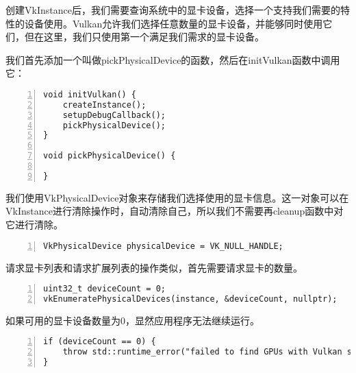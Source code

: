 \documentclass{ctexart}
\begin{document}
创建VkInstance后，我们需要查询系统中的显卡设备，选择一个支持我们需要的特性的设备使用。Vulkan允许我们选择任意数量的显卡设备，并能够同时使用它们，但在这里，我们只使用第一个满足我们需求的显卡设备。

我们首先添加一个叫做pickPhysicalDevice的函数，然后在initVulkan函数中调用它：

\begin{lstlisting}[language={[ANSI]C},keywordstyle=\color{blue!70},commentstyle=\color{red!50!green!50!blue!50},frame=shadowbox, rulesepcolor=\color{red!20!green!20!blue!20},basicstyle=\small,numbers=left, numberstyle=\tiny,breaklines=true]
void initVulkan() {
	createInstance();
	setupDebugCallback();
	pickPhysicalDevice();
}

void pickPhysicalDevice() {

}
\end{lstlisting}

我们使用VkPhysicalDevice对象来存储我们选择使用的显卡信息。这一对象可以在VkInstance进行清除操作时，自动清除自己，所以我们不需要再cleanup函数中对它进行清除。

\begin{lstlisting}[language={[ANSI]C},keywordstyle=\color{blue!70},commentstyle=\color{red!50!green!50!blue!50},frame=shadowbox, rulesepcolor=\color{red!20!green!20!blue!20},basicstyle=\small,numbers=left, numberstyle=\tiny,breaklines=true]
VkPhysicalDevice physicalDevice = VK_NULL_HANDLE;
\end{lstlisting}

请求显卡列表和请求扩展列表的操作类似，首先需要请求显卡的数量。

\begin{lstlisting}[language={[ANSI]C},keywordstyle=\color{blue!70},commentstyle=\color{red!50!green!50!blue!50},frame=shadowbox, rulesepcolor=\color{red!20!green!20!blue!20},basicstyle=\small,numbers=left, numberstyle=\tiny,breaklines=true]
uint32_t deviceCount = 0;
vkEnumeratePhysicalDevices(instance, &deviceCount, nullptr);
\end{lstlisting}

如果可用的显卡设备数量为0，显然应用程序无法继续运行。

\begin{lstlisting}[language={[ANSI]C},keywordstyle=\color{blue!70},commentstyle=\color{red!50!green!50!blue!50},frame=shadowbox, rulesepcolor=\color{red!20!green!20!blue!20},basicstyle=\small,numbers=left, numberstyle=\tiny,breaklines=true]
if (deviceCount == 0) {
	throw std::runtime_error("failed to find GPUs with Vulkan support!");
}
\end{lstlisting}
\end{document}
